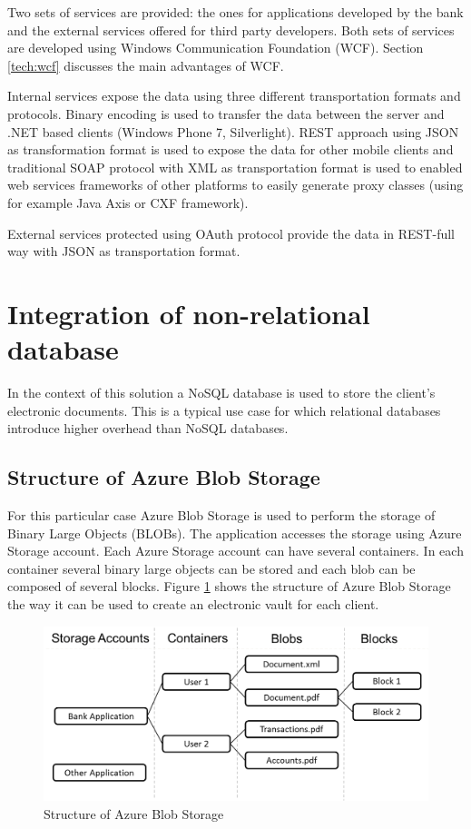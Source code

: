 Two sets of services are provided: the ones for applications developed by the bank and the external services offered for third party developers. Both sets of services are developed using Windows Communication Foundation (WCF). Section \ref{tech:wcf} discusses the main advantages of WCF.

Internal services expose the data using three different transportation formats and protocols. Binary encoding is used to transfer the data between the server and .NET based clients (Windows Phone 7, Silverlight). REST approach using JSON as transformation format is used to expose the data for other mobile clients and traditional SOAP protocol with XML as transportation format is used to enabled web services frameworks of other platforms to easily generate proxy classes (using for example Java Axis or CXF framework).

External services protected using OAuth protocol provide the data in REST-full way with JSON as transportation format.

\section{Integration of non-relational database}
\label{analysis:azureblob}
In the context of this solution a NoSQL database is used to store the client's electronic documents. This is a typical use case for which relational databases introduce higher overhead than NoSQL databases.

\subsection{Structure of Azure Blob Storage}
For this particular case Azure Blob Storage is used to perform the storage of Binary Large Objects (BLOBs). The application accesses the storage using Azure Storage account. Each Azure Storage account can have several containers. In each container several binary large objects can be stored and each blob can be composed of several blocks. Figure \ref{fig:azure_structure} shows the structure of Azure Blob Storage the way it can be used to create an electronic vault for each client.

\begin{figure}[h]
\begin{center}
\includegraphics[width=14cm]{figures/azure_storage_structure}
\caption{Structure of Azure Blob Storage}
\label{fig:azure_structure}
\end{center}
\end{figure}

